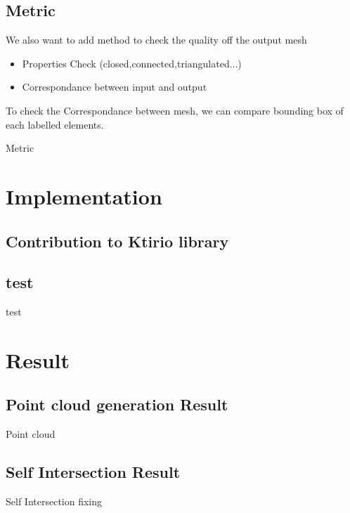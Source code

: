 \documentclass[10pt]{beamer}
\begin{document}
\subsection{Metric}
We also want to add method to check the quality off the output mesh
\begin{itemize}
    \item Properties Check (closed,connected,triangulated...)
    \item Correspondance between input and output
\end{itemize}
To check the Correspondance between mesh, we can compare bounding box of each labelled elements.
\begin{frame}{Metric}
    
\end{frame}

\section{Implementation}
\subsection{Contribution to Ktirio library}
\begin{frame}
    
\end{frame}

\subsection{test}
\begin{frame}{test}
\end{frame}

\section{Result}
\subsection{Point cloud generation Result}
\begin{frame}{Point cloud}
    
\end{frame}

\subsection{Self Intersection Result}
\begin{frame}{Self Intersection fixing}
    
\end{frame}
\end{document}
